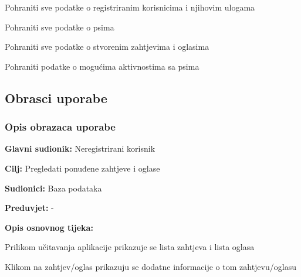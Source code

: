 \begin{packed_enum}
				\item {}
				\begin{packed_enum}
					\item Pohraniti sve podatke o registriranim korisnicima i njihovim ulogama
					\item Pohraniti sve podatke o psima
					\item Pohraniti sve podatke o stvorenim zahtjevima i oglasima
					\item Pohraniti podatke o mogućima aktivnostima sa psima
				\end{packed_enum}
			
			\end{packed_enum}
			
			\eject 
			
			
				
			\subsection{Obrasci uporabe}
				
				\subsubsection{Opis obrazaca uporabe}					

					\noindent {}
					\begin{packed_item}
	
						\item \textbf{Glavni sudionik: } Neregistrirani korisnik 
						\item  \textbf{Cilj:} Pregledati ponuđene zahtjeve i oglase
						\item  \textbf{Sudionici:} Baza podataka 
						\item  \textbf{Preduvjet:} -
						\item  \textbf{Opis osnovnog tijeka:}
						
						\item[] \begin{packed_enum}
	
							\item Prilikom učitavanja aplikacije prikazuje se lista zahtjeva i lista oglasa
							\item Klikom na zahtjev/oglas prikazuju se dodatne informacije o tom zahtjevu/oglasu
				
						\end{packed_enum}
					\end{packed_item}
					
